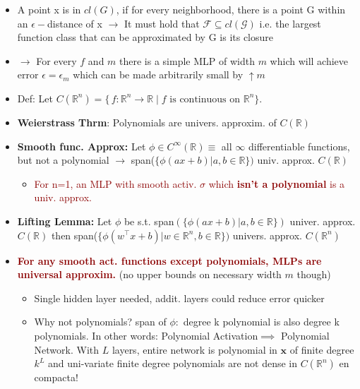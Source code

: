 \begin{itemize}
\item A point x is in \(cl(G)\), if for every neighborhood, there is a point G within an \(\epsilon-\)distance of x \(\rightarrow\) It must hold that \(\mathcal{F}\subseteq cl(\mathcal{G})\) i.e. the largest function class that can be approximated
by G is its closure
\item \(\rightarrow\) For every \(f\) and \(m\) there is a simple MLP of width \(m\) which will achieve error \(\epsilon=\epsilon_m\) which can be made arbitrarily small by \(\uparrow m\)
\item Def: Let $C(\mathbb{R}^n) = \{\,f : \mathbb{R}^n \to \mathbb{R}\mid f \text{ is continuous on } \mathbb{R}^n\}.$
\item \textbf{Weierstrass Thrm}: Polynomials are univers. approxim. of \(C(\mathbb{R})\)
\item \textbf{Smooth func. Approx:} Let \(\phi \in C^\infty(\mathbb{R})\equiv\) all $\infty$ differentiable functions, but not a polynomial \(\rightarrow\) span(\(\{\phi (ax+b)|a,b \in \mathbb{R}\})\) univ. approx. \(C(\mathbb{R})\) 
\begin{itemize}
    \item \textcolor{darkred}{For n=1, an MLP with smooth activ. \(\sigma\) which \textbf{isn't a polynomial} is a univ. approx.}
\end{itemize}
\item \textbf{Lifting Lemma:} Let \(\phi\) be s.t. span\((\{\phi(ax+b)|a,b\in \mathbb{R}\})\) univer. approx. \(C(\mathbb{R})\) then span(\(\{\phi(w^\top x+b)|w\in \mathbb{R}^n, b\in \mathbb{R}\})\) univers. approx. \(C(\mathbb{R}^n)\)
\item \textbf{\textcolor{darkred}{For any smooth act. functions except polynomials, MLPs are universal approxim.}} (no upper bounds on necessary width \(m\) though)
\begin{itemize}
    \item Single hidden layer needed, addit. layers could reduce error quicker
\end{itemize}
\begin{itemize}
    \item Why not polynomials? span of \(\phi:\) degree k polynomial is also degree k polynomials. In other words: Polynomial Activation\(\implies\) Polynomial Network. With \(L\) layers, entire network is polynomial in \(\mathbf{x}\) of finite degree \(k^L\) and uni-variate finite degree polynomials are not dense in \(C(\mathbb{R}^n)\) en compacta!
\end{itemize}

\end{itemize}
